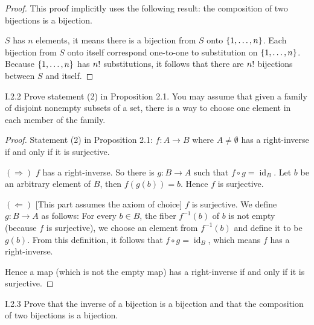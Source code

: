 \begin{proof}
	This proof implicitly uses the following result: the composition of two bijections is a bijection.

	$S$ has $n$ elements, it means there is a bijection from $S$ onto $\left\{{1, \ldots, n}\right\}$. Each bijection from $S$ onto itself correspond one-to-one to substitution on $\left\{{1, \ldots, n}\right\}$. Because $\left\{{1, \ldots, n}\right\}$ has ${n}!$ substitutions, it follows that there are ${n}!$ bijections between $S$ and itself.
\end{proof}

\begin{exercise}{I.2.2}
	Prove statement (2) in Proposition 2.1. You may assume that given a family of disjoint nonempty subsets of a set, there is a way to choose one element in each
	member of the family.
\end{exercise}

\begin{proof}
	Statement (2) in Proposition 2.1: $f: A\to B$ where $A\ne\emptyset$ has a right-inverse if and only if it is surjective.

	$(\Longrightarrow)$ $f$ has a right-inverse. So there is $g: B\to A$ such that $f\circ g = \operatorname{id}_{B}$. Let $b$ be an arbitrary element of $B$, then $f(g(b)) = b$. Hence $f$ is surjective.

	$(\Longleftarrow)$ [This part assumes the axiom of choice] $f$ is surjective. We define $g: B\to A$ as follows: For every $b\in B$, the fiber $f^{-1}(b)$ of $b$ is not empty (because $f$ is surjective), we choose an element from $f^{-1}(b)$ and define it to be $g(b)$. From this definition, it follows that $f\circ g = \operatorname{id}_{B}$, which means $f$ has a right-inverse.

	Hence a map (which is not the empty map) has a right-inverse if and only if it is surjective.
\end{proof}

\begin{exercise}{I.2.3}
	Prove that the inverse of a bijection is a bijection and that the composition of two bijections is a bijection.
\end{exercise}

